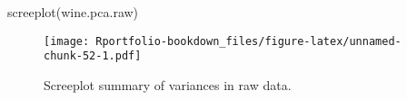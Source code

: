 \documentclass[
]{book}
\newenvironment{Shaded}{\begin{snugshade}}{\end{snugshade}}
\newcommand{\CommentTok}[1]{\textcolor[rgb]{0.56,0.35,0.01}{\textit{#1}}}
\newcommand{\FunctionTok}[1]{\textcolor[rgb]{0.00,0.00,0.00}{#1}}
\newcommand{\NormalTok}[1]{#1}
\newcommand{\SpecialCharTok}[1]{\textcolor[rgb]{0.00,0.00,0.00}{#1}}
\begin{document}
\begin{Shaded}
\begin{Highlighting}[]
\FunctionTok{screeplot}\NormalTok{(wine.pca.raw)}
\end{Highlighting}
\end{Shaded}

\begin{figure}
\centering
\texttt{[image: Rportfolio-bookdown\_files/figure-latex/unnamed-chunk-52-1.pdf]}
\caption{\label{fig:unnamed-chunk-52}Screeplot summary of variances in raw data.}
\end{figure}

\begin{Shaded}
\end{Shaded}
\end{document}
